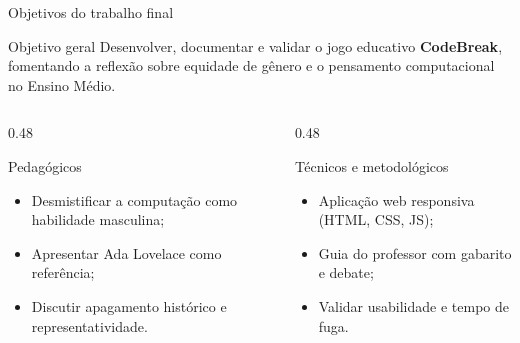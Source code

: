 \documentclass[aspectratio=169, 10pt, t]{beamer}
\begin{document}
\begin{frame}{Objetivos do trabalho final}
  \begin{card}{Objetivo geral}
    \small Desenvolver, documentar e validar o jogo educativo \textbf{CodeBreak}, fomentando a reflexão sobre equidade de gênero e o pensamento computacional no Ensino Médio.
  \end{card}
  \begin{columns}[T]
    \begin{column}{0.48\textwidth}
      \begin{card}{Pedagógicos}
        \footnotesize
        \begin{itemize}
          \item Desmistificar a computação como habilidade masculina;
          \item Apresentar Ada Lovelace como referência;
          \item Discutir apagamento histórico e representatividade.
        \end{itemize}
      \end{card}
    \end{column}
    \begin{column}{0.48\textwidth}
      \begin{card}{Técnicos e metodológicos}
        \footnotesize
        \begin{itemize}
          \item Aplicação web responsiva (HTML, CSS, JS);
          \item Guia do professor com gabarito e debate;
          \item Validar usabilidade e tempo de fuga.
        \end{itemize}
      \end{card}
    \end{column}
  \end{columns}
\end{frame}
\end{document}
